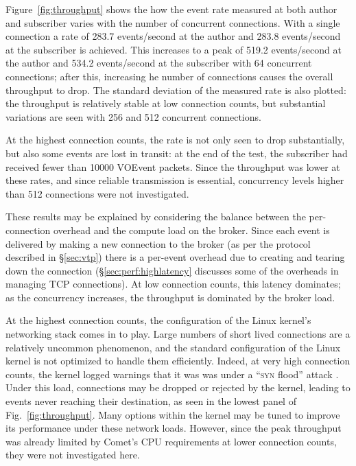 \documentclass[5p,authoryear]{elsarticle}
\begin{document}
Figure~\ref{fig:throughput} shows the how the event rate measured at both
author and subscriber varies with the number of concurrent connections. With a
single connection a rate of 283.7 events/second at the author and 283.8
events/second at the subscriber is achieved. This increases to a peak of 519.2
events/second at the author and 534.2 events/second at the subscriber with 64
concurrent connections; after this, increasing he number of connections causes
the overall throughput to drop. The standard deviation of the measured rate is
also plotted: the throughput is relatively stable at low connection counts,
but substantial variations are seen with 256 and 512 concurrent connections.

At the highest connection counts, the rate is not only seen to drop
substantially, but also some events are lost in transit: at the end of the
test, the subscriber had received fewer than 10000 VOEvent packets. Since the
throughput was lower at these rates, and since reliable transmission is
essential, concurrency levels higher than 512 connections were not
investigated.

These results may be explained by considering the balance between the
per-connection overhead and the compute load on the broker. Since each event
is delivered by making a new connection to the broker (as per the protocol
described in \S\ref{sec:vtp}) there is a per-event overhead due to creating
and tearing down the connection (\S\ref{sec:perf:highlatency} discusses some
of the overheads in managing TCP connections). At low connection counts, this
latency dominates; as the concurrency increases, the throughput is dominated
by the broker load.

At the highest connection counts, the configuration of the Linux kernel's
networking stack comes in to play. Large numbers of short lived connections
are a relatively uncommon phenomenon, and the standard configuration of the
Linux kernel is not optimized to handle them efficiently. Indeed, at very high
connection counts, the kernel logged warnings that it was was under a
``\textsc{syn} flood'' attack \citep{CERT:1996}. Under this load, connections
may be dropped or rejected by the kernel, leading to events never reaching
their destination, as seen in the lowest panel of Fig.~\ref{fig:throughput}.
Many options within the kernel may be tuned to improve its performance under
these network loads. However, since the peak throughput was already limited by
Comet's CPU requirements at lower connection counts, they were not
investigated here.
\end{document}
